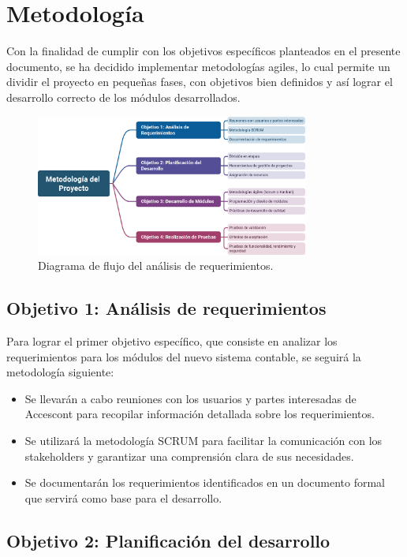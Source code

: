 \documentclass{article}
\begin{document}
\section{Metodología}

Con la finalidad de cumplir con los objetivos específicos planteados en el presente documento, se ha decidido implementar metodologías agiles, lo cual permite un dividir el proyecto en pequeñas fases, con objetivos bien definidos y así lograr el desarrollo correcto de los módulos desarrollados.  

\begin{figure}[h]
    \centering
    \includegraphics[width=0.8\textwidth]{med.png}
    \caption{Diagrama de flujo del análisis de requerimientos.}
\end{figure}

\subsection{Objetivo 1: Análisis de requerimientos}

Para lograr el primer objetivo específico, que consiste en analizar los requerimientos para los módulos del nuevo sistema contable, se seguirá la metodología siguiente:

\begin{itemize}
    \item Se llevarán a cabo reuniones con los usuarios y partes interesadas de Accescont para recopilar información detallada sobre los requerimientos.
    \item Se utilizará la metodología SCRUM para facilitar la comunicación con los stakeholders y garantizar una comprensión clara de sus necesidades.
    \item Se documentarán los requerimientos identificados en un documento formal que servirá como base para el desarrollo.
\end{itemize}

\subsection{Objetivo 2: Planificación del desarrollo}
\end{document}
